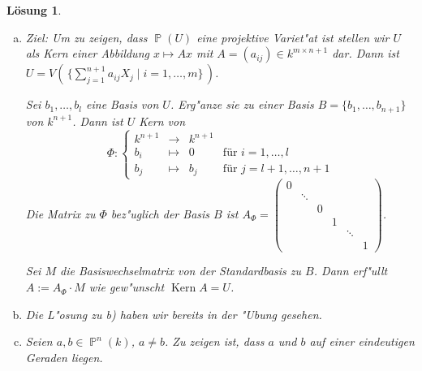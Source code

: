 \documentclass[a4paper, 12pt, numbers=noendperiod, chapterprefix=true]{scrbook}
\theoremstyle{break}
\newtheorem{Loes}{L\"osung}
\theoremstyle{nonumberbreak}
\theoremstyle{nonumberplain}
\DeclareMathOperator{\Kern}{Kern}
\newcommand{\A}{\mathbb{A}}
\DeclareMathOperator{\Projective}{\mathbb{P}} %
\begin{document}
\begin{Loes}\begin{enumerate}[a)]
\item
	Ziel: Um zu zeigen, dass $\Projective(U)$ eine projektive Variet"at ist stellen wir $U$ als Kern einer Abbildung $x \mapsto Ax$ mit $A = (a_{ij}) \in k^{m \times n+1}$ dar. Dann ist $U = V( \,\{ \sum_{j=1}^{n+1} a_{ij} X_j \mid i = 1, \dots, m \}\,)$.
	
	Sei $b_1, \dots, b_l$ eine Basis von $U$. Erg"anze sie zu einer Basis $B = \{ b_1, \dots, b_{n+1} \}$ von $k^{n+1}$. Dann ist $U$ Kern von
		\[\Phi: \left \{ \begin{array}{rcll}
			k^{n+1}& \to & k^{n+1}\\
			b_i &\mapsto& 0 &\textrm{für } i = 1, \dots, l\\
			b_j &\mapsto& b_j &\textrm{für } j = l+1, \dots, n+1
		\end{array} \right.\]
	Die Matrix zu $\Phi$ bez"uglich der Basis $B$ ist 
		$A_\Phi= \left( \begin{smallmatrix}
                                                           0 \\ 
                                                           & \ddots \\
                                                           & & 0 \\
                                                           & & & 1 \\ 
                                                           &&&& \ddots \\
                                                           &&&&& 1 
                                                          \end{smallmatrix}
		\right)$.

	Sei $M$ die Basiswechselmatrix von der Standardbasis zu $B$. Dann erf"ullt $A := A_\Phi \cdot M$ wie gew"unscht $\Kern A = U$.

\item
	Die L"osung zu b) haben wir bereits in der "Ubung gesehen.
\item
	Seien $a,b \in \Projective^n(k)$, $a \neq b$. Zu zeigen ist, dass $a$ und $b$ auf einer eindeutigen Geraden liegen.
	

\end{enumerate}
\end{Loes}
\end{document}
